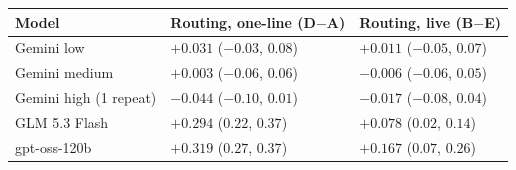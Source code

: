 \begin{tabularx}{\linewidth}{lYY}
\toprule
Model & Routing, one-line (D$-$A) & Routing, live (B$-$E) \\
\midrule
Gemini low & $+0.031$ ($-0.03$, $0.08$) & $+0.011$ ($-0.05$, $0.07$) \\
Gemini medium & $+0.003$ ($-0.06$, $0.06$) & $-0.006$ ($-0.06$, $0.05$) \\
Gemini high (1 repeat) & $-0.044$ ($-0.10$, $0.01$) & $-0.017$ ($-0.08$, $0.04$) \\
GLM 5.3 Flash & $+0.294$ ($0.22$, $0.37$) & $+0.078$ ($0.02$, $0.14$) \\
gpt-oss-120b & $+0.319$ ($0.27$, $0.37$) & $+0.167$ ($0.07$, $0.26$) \\
\bottomrule
\end{tabularx}
